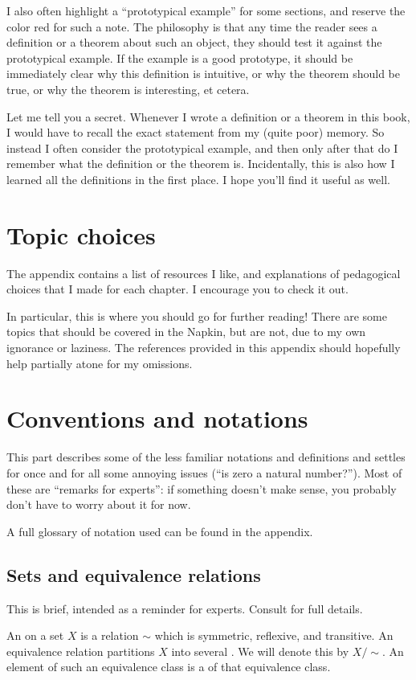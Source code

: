 I also often highlight a ``prototypical example'' for some sections,
and reserve the color red for such a note.
The philosophy is that any time the reader sees a definition
or a theorem about such an object, they should test it
against the prototypical example.
If the example is a good prototype, it should be immediately clear
why this definition is intuitive, or why the theorem should be true,
or why the theorem is interesting, et cetera.

Let me tell you a secret.  Whenever I wrote a definition or a theorem in this book,
I would have to recall the exact statement from my (quite poor) memory.
So instead I often consider the prototypical example,
and then only after that do I remember what the definition or the theorem is.
Incidentally, this is also how I learned all the definitions in the first place.
I hope you'll find it useful as well.

\section{Topic choices}
The appendix contains a list of resources I like,
and explanations of pedagogical choices that I made for each chapter.
I encourage you to check it out.

In particular, this is where you should go for further reading!
There are some topics that should be covered in the Napkin,
but are not, due to my own ignorance or laziness.
The references provided in this appendix should hopefully help partially
atone for my omissions.

\section{Conventions and notations}
This part describes some of the less familiar notations and definitions
and settles for once and for all some annoying issues (``is zero a natural number?'').
Most of these are ``remarks for experts'':
if something doesn't make sense, you probably don't have to worry about it for now.

A full glossary of notation used can be found in the appendix.

\subsection*{Sets and equivalence relations}
This is brief, intended as a reminder for experts.
Consult  for full details.

An  on a set $X$ is a relation $\sim$
which is symmetric, reflexive, and transitive.
An equivalence relation partitions $X$ into several .
We will denote this by $X / {\sim}$.
An element of such an equivalence class is a  of that equivalence class.

